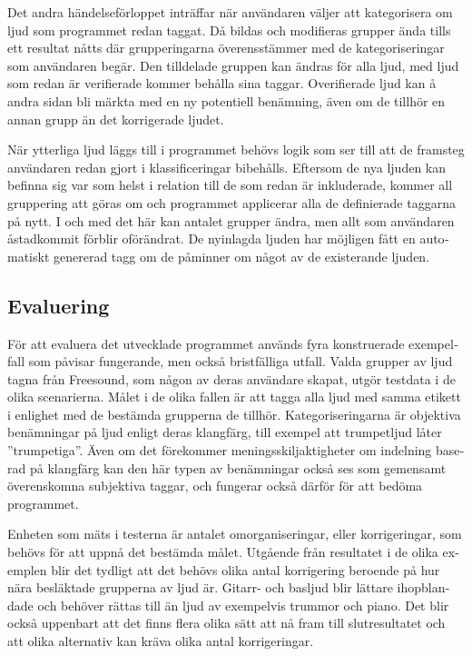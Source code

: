 \begin{otherlanguage}{swedish}
    Det andra händelseförloppet inträffar när användaren väljer att kategorisera om ljud som programmet redan taggat. Då bildas och modifieras grupper ända tills ett resultat nåtts där grupperingarna överensstämmer med de kategoriseringar som användaren begär. Den tilldelade gruppen kan ändras för alla ljud, med ljud som redan är verifierade kommer behålla sina taggar. Overifierade ljud kan å andra sidan bli märkta med en ny potentiell benämning, även om de tillhör en annan grupp än det korrigerade ljudet.

    När ytterliga ljud läggs till i programmet behövs logik som ser till att de framsteg användaren redan gjort i klassificeringar bibehålls. Eftersom de nya ljuden kan befinna sig var som helst i relation till de som redan är inkluderade, kommer all gruppering att göras om och programmet applicerar alla de definierade taggarna på nytt. I och med det här kan antalet grupper ändra, men allt som användaren åstadkommit förblir oförändrat. De nyinlagda ljuden har möjligen fått en automatiskt genererad tagg om de påminner om något av de existerande ljuden.

    \subsection*{Evaluering}
    För att evaluera det utvecklade programmet används fyra konstruerade exempelfall som påvisar fungerande, men också bristfälliga utfall. Valda grupper av ljud tagna från Freesound, som någon av deras användare skapat, utgör testdata i de olika scenarierna. Målet i de olika fallen är att tagga alla ljud med samma etikett i enlighet med de bestämda grupperna de tillhör. Kategoriseringarna är objektiva benämningar på ljud enligt deras klangfärg, till exempel att trumpetljud låter ”trumpetiga”. Även om det förekommer meningsskiljaktigheter om indelning baserad på klangfärg kan den här typen av benämningar också ses som gemensamt överenskomna subjektiva taggar, och fungerar också därför för att bedöma programmet.

    Enheten som mäts i testerna är antalet omorganiseringar, eller korrigeringar, som behövs för att uppnå det bestämda målet. Utgående från resultatet i de olika exemplen blir det tydligt att det behövs olika antal korrigering beroende på hur nära besläktade grupperna av ljud är. Gitarr- och basljud blir lättare ihopblandade och behöver rättas till än ljud av exempelvis trummor och piano. Det blir också uppenbart att det finns flera olika sätt att nå fram till slutresultatet och att olika alternativ kan kräva olika antal korrigeringar.


\end{otherlanguage}
